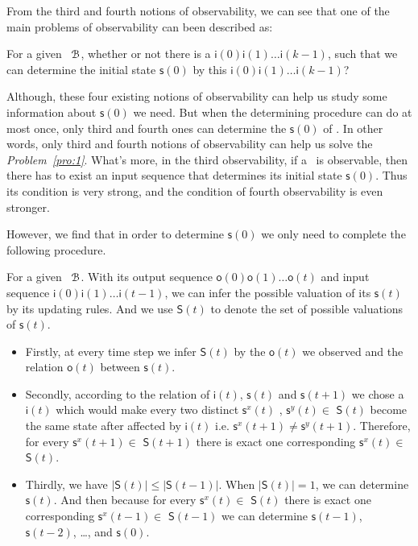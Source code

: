  From the third and fourth notions of observability, we can see that one of the main problems of observability can been described as: 

\begin{problem}
\label{pro:1}
For a given \BCN\ ${\mathcal{B}}$, whether or not there is a $\mathsf{i}(0)\mathsf{i}(1)\ldots\mathsf{i}(k-1)$, such that we can determine the initial state $\mathsf{s}(0)$ by this $\mathsf{i}(0)\mathsf{i}(1)\ldots\mathsf{i}(k-1)$?
\end{problem}

Although, these four existing notions of observability can help us study some information about $\mathsf{s}(0)$ we need. But when the determining procedure can do at most once, only third and fourth ones  can  determine the $\mathsf{s}(0)$ of \BCNs.
In other words, only third and fourth notions of observability can help us solve the {\em Problem~\ref{pro:1}}. What's more, in the third observability, if a \BCN\ is observable, then there has to exist an input sequence that determines its initial state $\mathsf{s}(0)$. Thus its condition is very strong, and the condition of fourth observability is even stronger.


However, we find that in order to determine $\mathsf{s}(0)$ we only need to complete the following procedure.

For a given \BCN\  ${\mathcal{B}}$. With its output sequence $\mathsf{o}(0)\mathsf{o}(1)\ldots\mathsf{o}(t)$ and input sequence $\mathsf{i}(0)\mathsf{i}(1)\ldots\mathsf{i}(t-1)$, we can infer the possible valuation of its $\mathsf{s}(t)$ by its updating rules. And  we use $\mathsf{S}(t)$ to denote the set of possible valuations of $\mathsf{s}(t)$. 
\begin{itemize}
	\item  Firstly, at every time step we infer $\mathsf{S}(t)$ by the $\mathsf{o}(t)$ we observed and the relation $\mathsf{o}(t)$ between $\mathsf{s}(t)$.
	\item Secondly, according to the relation of $\mathsf{i}(t)$, $\mathsf{s}(t)$ and $\mathsf{s}(t+1)$ we chose a $\mathsf{i}(t)$ which would make every two distinct $\mathsf{s}^{x}(t)$ , $\mathsf{s}^{y}(t)$$\in$ $\mathsf{S}(t)$ become the same state after affected by $\mathsf{i}(t)$ i.e. $\mathsf{s}^{x}(t+1)\ne\mathsf{s}^{y}(t+1)$. Therefore, for every $\mathsf{s}^{x}(t+1)\in $ $\mathsf{S}(t+1)$ there is exact one corresponding $\mathsf{s}^{x}(t)\in $ $\mathsf{S}(t)$.
	\item Thirdly, we have $|$$\mathsf{S}(t)$$|\le|$$\mathsf{S}(t-1)$$|$. When $|$$\mathsf{S}(t)$$|=1$, we can determine $\mathsf{s}(t)$. And then because for every $\mathsf{s}^{x}(t)\in $ $\mathsf{S}(t)$ there is exact one corresponding $\mathsf{s}^{x}(t-1)\in $ $\mathsf{S}(t-1)$ we can determine $\mathsf{s}(t-1)$, $\mathsf{s}(t-2)$, \ldots, and $\mathsf{s}(0)$.
\end{itemize}

